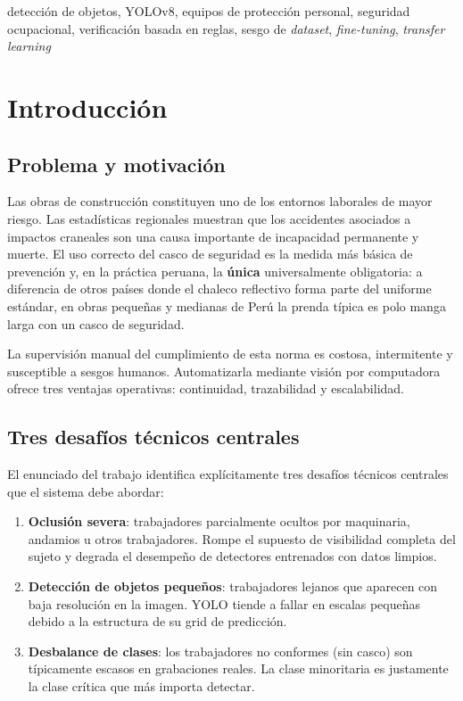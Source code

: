 \documentclass[journal,onecolumn,11pt]{IEEEtran}
\begin{document}
\begin{IEEEkeywords}
detección de objetos, YOLOv8, equipos de protección personal,
seguridad ocupacional, verificación basada en reglas, sesgo de
\textit{dataset}, \textit{fine-tuning}, \textit{transfer learning}
\end{IEEEkeywords}

\section{Introducción}

\subsection{Problema y motivación}

Las obras de construcción constituyen uno de los entornos laborales
de mayor riesgo. Las estadísticas regionales muestran que los
accidentes asociados a impactos craneales son una causa importante
de incapacidad permanente y muerte. El uso correcto del casco de
seguridad es la medida más básica de prevención y, en la práctica
peruana, la \textbf{única} universalmente obligatoria: a diferencia
de otros países donde el chaleco reflectivo forma parte del uniforme
estándar, en obras pequeñas y medianas de Perú la prenda típica es
polo manga larga con un casco de seguridad.

La supervisión manual del cumplimiento de esta norma es costosa,
intermitente y susceptible a sesgos humanos. Automatizarla mediante
visión por computadora ofrece tres ventajas operativas: continuidad,
trazabilidad y escalabilidad.

\subsection{Tres desafíos técnicos centrales}

El enunciado del trabajo identifica explícitamente tres desafíos
técnicos centrales que el sistema debe abordar:

\begin{enumerate}[leftmargin=*]
    \item \textbf{Oclusión severa}: trabajadores parcialmente ocultos
    por maquinaria, andamios u otros trabajadores. Rompe el supuesto
    de visibilidad completa del sujeto y degrada el desempeño de
    detectores entrenados con datos limpios.
    \item \textbf{Detección de objetos pequeños}: trabajadores lejanos
    que aparecen con baja resolución en la imagen. YOLO tiende a
    fallar en escalas pequeñas debido a la estructura de su grid de
    predicción.
    \item \textbf{Desbalance de clases}: los trabajadores no conformes
    (sin casco) son típicamente escasos en grabaciones reales. La
    clase minoritaria es justamente la clase crítica que más importa
    detectar.
\end{enumerate}
\end{document}

